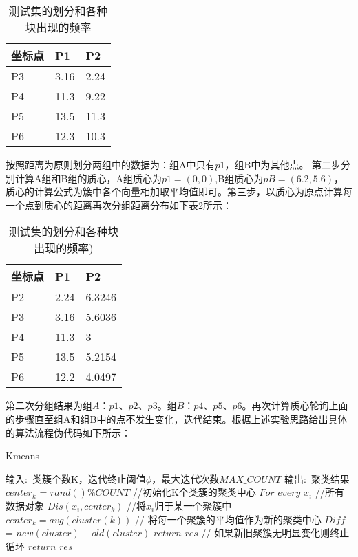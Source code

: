 \begin{table}[H]
\centering
\caption{测试集的划分和各种块出现的频率}\label{ptabl1}
\begin{tabular}{p{4cm}<{\centering}p{4cm}<{\centering}p{4cm}<{\centering}}
\toprule
\textbf{坐标点}&	\textbf{P1}&     \textbf{P2}\\
\midrule
P3	&3.16	&2.24\\
P4	&11.3	&9.22\\
P5	&13.5	&11.3\\
P6	&12.3	&10.3\\
\bottomrule
\end{tabular}
\end{table}


按照距离为原则划分两组中的数据为：组A中只有$p1$，组B中为其他点。
第二步分别计算A组和B组的质心，A组质心为$p1=(0,0)$,B组质心为$pB=(6.2,5.6)$，质心的计算公式为簇中各个向量相加取平均值即可。第三步，以质心为原点计算每一个点到质心的距离再次分组距离分布如下表\ref{ptabl2}所示：

\begin{table}[H]
\centering
\caption{测试集的划分和各种块出现的频率)}\label{ptabl2}
\begin{tabular}{p{4cm}<{\centering}p{4cm}<{\centering}p{4cm}<{\centering}}
\toprule
\textbf{坐标点}&	\textbf{P1}&     \textbf{P2}\\
\midrule
P2	&2.24	&6.3246\\
P3	&3.16	&5.6036\\
P4	&11.3	&3\\
P5	&13.5	&5.2154\\
P6	&12.2	&4.0497\\
\bottomrule
\end{tabular}
\end{table}

第二次分组结果为组$A$：$p1$、$p2$、$p3$。组$B$：$p4$、$p5$、$p6$。再次计算质心轮询上面的步骤直至组A和组B中的点不发生变化，迭代结束。根据上述实验思路给出具体的算法流程伪代码如下所示：

\begin{algorithm}[!h]
	\caption{Kmeans}%
	\begin{algorithmic}%
        \STATE 输入$:$   $ $类簇个数K，迭代终止阈值$\phi$，最大迭代次数$MAX\_COUNT$
        \STATE 输出$:$   $ $聚类结果
        \STATE $center_k$ = $rand()\%COUNT$ //初始化K个类簇的聚类中心
        \ENDFOR
        \STATE $For$ $every$ $x_i$ //所有数据对象
        \STATE $Dis(x_i,center_k)$ //将$x_i$归于某一个聚簇中
        \ENDFOR
        \STATE $center_k=avg(cluster(k))$ // 将每一个聚簇的平均值作为新的聚类中心
        \ENDFOR
        \STATE $Diff$ = $new(cluster)-old(cluster)$
		\STATE $return$  $res$ // 如果新旧聚簇无明显变化则终止循环
		\ENDIF
        \ENDFOR
        \STATE $return$  $res$
	\end{algorithmic}
\end{algorithm}

